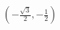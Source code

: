 \documentclass[preview]{standalone}
\begin{document}
\begin{align*}
\left(-\frac{\sqrt{3}}{2}, -\frac{1}{2}\right)
\end{align*}
\end{document}
